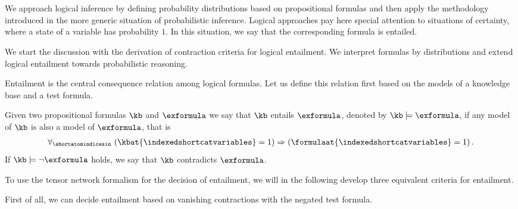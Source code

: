 \chapter{\chatextlogicalReasoning}\label{cha:logicalReasoning}

We approach logical inference by defining probability distributions based on propositional formulas and then apply the methodology introduced in the more generic situation of probabilistic inference.
Logical approaches pay here special attention to situations of certainty, where a state of a variable has probability $1$.
In this situation, we say that the corresponding formula is entailed.

We start the discussion with the derivation of contraction criteria for logical entailment.
We interpret formulas by distributions and extend logical entailment towards probabilistic reasoning.


Entailment is the central consequence relation among logical formulas.
Let us define this relation first based on the models of a knowledge base and a test formula.

\begin{definition}
    \label{def:logicalEntailment}
    Given two propositional formulas $\kb$ and $\exformula$ we say that $\kb$ entails $\exformula$, denoted by $\kb\models\exformula$, if any model of $\kb$ is also a model of $\exformula$, that is
    \begin{align*}
        \uniquantwrtof{\shortatomindicesin}{\imppremhead{\kbat{\indexedshortcatvariables}=1}{\formulaat{\indexedshortcatvariables}=1}} \, .
    \end{align*}
    If $\kb\models\lnot\exformula$ holds, we say that $\kb$ contradicts $\exformula$.
\end{definition}

To use the tensor network formalism for the decision of entailment, we will in the following develop three equivalent criteria for entailment. %


First of all, we can decide entailment based on vanishing contractions with the negated test formula.


